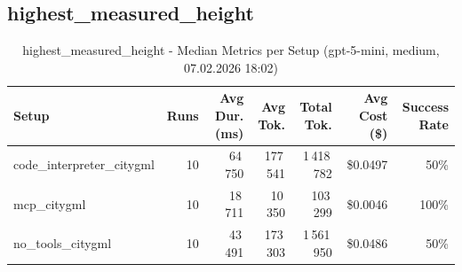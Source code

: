 \documentclass[a4paper,11pt]{article}
\begin{document}
\clearpage

\subsection{highest\_measured\_height}

\begin{table}[H]
\centering
\scriptsize
\caption{highest\_measured\_height - Median Metrics per Setup (gpt-5-mini, medium, 07.02.2026 18:02)}
\label{tab:combined\_highest\_measured\_height\_metrics\_20260207}
\begin{tabular}{l r r r r r r}
\toprule
Setup & Runs & Avg Dur. (ms) & Avg Tok. & Total Tok. & Avg Cost (\$) & Success Rate \\
\midrule
code\_interpreter\_citygml & 10 & 64\,750 & 177\,541 & 1\,418\,782 & \$0.0497 & 50\% \\
mcp\_citygml & 10 & 18\,711 & 10\,350 & 103\,299 & \$0.0046 & 100\% \\
no\_tools\_citygml & 10 & 43\,491 & 173\,303 & 1\,561\,950 & \$0.0486 & 50\% \\
\bottomrule
\end{tabular}
\end{table}
\end{document}
